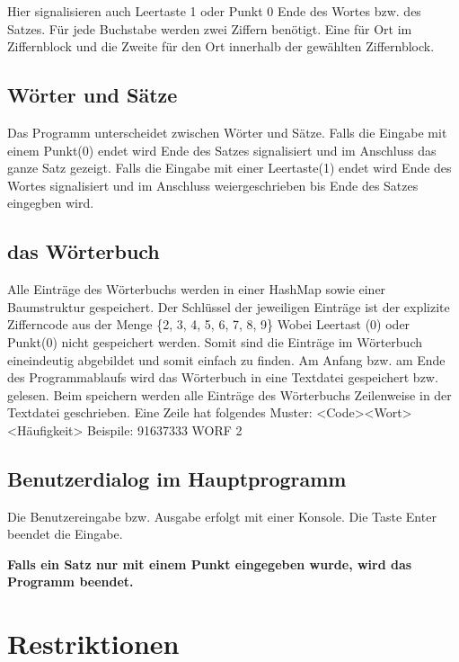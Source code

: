 Hier signalisieren auch Leertaste 1 oder Punkt 0 Ende des Wortes bzw. des Satzes.
Für jede Buchstabe werden zwei Ziffern benötigt. Eine für Ort im Ziffernblock und die Zweite für den Ort innerhalb der gewählten Ziffernblock.

\subsection{Wörter und Sätze}
Das Programm unterscheidet zwischen Wörter und Sätze. Falls die Eingabe mit einem Punkt(0) endet wird Ende des Satzes signalisiert und im Anschluss das ganze Satz gezeigt.
Falls die Eingabe mit einer Leertaste(1) endet wird Ende des Wortes signalisiert und im Anschluss weiergeschrieben bis Ende des Satzes eingegben wird.


\subsection{das Wörterbuch}
\label{dic}
Alle Einträge des Wörterbuchs werden in einer HashMap sowie einer Baumstruktur gespeichert. Der Schlüssel der jeweiligen Einträge ist der explizite Zifferncode aus der Menge \{2, 3, 4, 5, 6, 7, 8, 9\} Wobei Leertast (0) oder Punkt(0) nicht gespeichert werden.
Somit sind die Einträge im Wörterbuch eineindeutig abgebildet und somit einfach zu finden.
Am Anfang bzw. am Ende des Programmablaufs wird das Wörterbuch in eine Textdatei gespeichert bzw. gelesen.
Beim speichern werden alle Einträge des Wörterbuchs Zeilenweise in der Textdatei geschrieben.
Eine Zeile hat folgendes Muster: \textless Code\textgreater \textless Wort\textgreater \textless Häufigkeit\textgreater 
\newline
Beispile: 91637333 WORF 2

\subsection{Benutzerdialog im Hauptprogramm}
Die Benutzereingabe bzw. Ausgabe erfolgt mit einer Konsole. Die Taste Enter beendet die Eingabe.

\textbf{Falls ein Satz nur mit einem Punkt eingegeben wurde, wird das Programm beendet.}

\section{Restriktionen}

